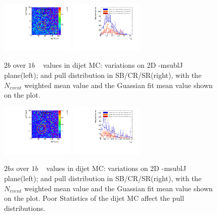 \begin{figure}[htbp!]
\begin{center}
\includegraphics[width=0.31\textwidth,angle=-90]{figures/boosted/AppendixMuqcdstudy/QCD_TwoTag_Incl_mH0H1.pdf}
\includegraphics[width=0.31\textwidth,angle=-90]{figures/boosted/AppendixMuqcdstudy/QCD_TwoTag_Incl_mH0H1_pull.pdf}
\caption{$2b$ over $1b$ \muqcd~ values in dijet MC: \muqcd variations on 2D \mleadJ-msublJ plane(left); and \muqcd pull distribution in SB/CR/SR(right), with the $N_{event}$ weighted mean value and the Guassian fit mean value shown on the plot.}
\label{fig:app-muqcd-2b-qcd}
\end{center}
\end{figure}

\begin{figure}[htbp!]
\begin{center}
\includegraphics[width=0.31\textwidth,angle=-90]{figures/boosted/AppendixMuqcdstudy/QCD_TwoTag_split_Incl_mH0H1.pdf}
\includegraphics[width=0.31\textwidth,angle=-90]{figures/boosted/AppendixMuqcdstudy/QCD_TwoTag_split_Incl_mH0H1_pull.pdf}
\caption{$2bs$ over $1b$ \muqcd~ values in dijet MC: \muqcd variations on 2D \mleadJ-msublJ plane(left); and \muqcd pull distribution in SB/CR/SR(right), with the $N_{event}$ weighted mean value and the Guassian fit mean value shown on the plot. Poor Statistics of the dijet MC affect the pull distributions.}
\label{fig:app-muqcd-2bs-qcd}
\end{center}
\end{figure}

